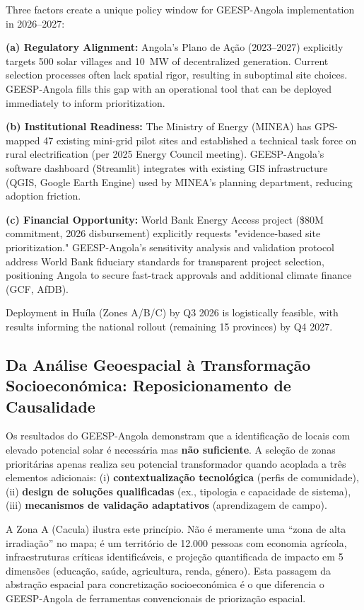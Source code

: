 \documentclass[12pt, a4paper]{article}
\begin{document}
Three factors create a unique policy window for GEESP-Angola implementation in 2026--2027:

\textbf{(a) Regulatory Alignment:} Angola's Plano de Ação (2023--2027) explicitly targets 500 solar villages and 10~MW of decentralized generation. Current selection processes often lack spatial rigor, resulting in suboptimal site choices. GEESP-Angola fills this gap with an operational tool that can be deployed immediately to inform prioritization.

\textbf{(b) Institutional Readiness:} The Ministry of Energy (MINEA) has GPS-mapped 47 existing mini-grid pilot sites and established a technical task force on rural electrification (per 2025 Energy Council meeting). GEESP-Angola's software dashboard (Streamlit) integrates with existing GIS infrastructure (QGIS, Google Earth Engine) used by MINEA's planning department, reducing adoption friction.

\textbf{(c) Financial Opportunity:} World Bank Energy Access project (\$80M commitment, 2026 disbursement) explicitly requests "evidence-based site prioritization." GEESP-Angola's sensitivity analysis and validation protocol address World Bank fiduciary standards for transparent project selection, positioning Angola to secure fast-track approvals and additional climate finance (GCF, AfDB).

Deployment in Huíla (Zones A/B/C) by Q3 2026 is logistically feasible, with results informing the national rollout (remaining 15 provinces) by Q4 2027.

\subsection{Da Análise Geoespacial à Transformação Socioeconómica: Reposicionamento de Causalidade}

Os resultados do GEESP-Angola demonstram que a identificação de locais com elevado 
potencial solar é necessária mas \textbf{não suficiente}. A seleção de zonas prioritárias 
apenas realiza seu potencial transformador quando acoplada a três elementos adicionais: 
(i) \textbf{contextualização tecnológica} (perfis de comunidade), (ii) \textbf{design de 
soluções qualificadas} (ex., tipologia e capacidade de sistema), (iii) \textbf{mecanismos 
de validação adaptativos} (aprendizagem de campo).

A Zona A (Cacula) ilustra este princípio. Não é meramente uma ``zona de alta irradiação'' 
no mapa; é um território de 12.000 pessoas com economia agrícola, infraestruturas críticas 
identificáveis, e projeção quantificada de impacto em 5 dimensões (educação, saúde, 
agricultura, renda, género). Esta passagem da abstração espacial para concretização 
socioeconómica é o que diferencia o GEESP-Angola de ferramentas convencionais de 
priorização espacial.
\end{document}
